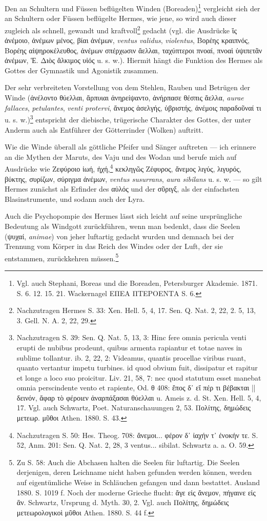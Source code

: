 \documentclass[a4paper, 11pt, oneside]{article}
\begin{document}
Den an Schultern und Füssen beflügelten Winden (Boreaden)\footnote{Vgl. auch Stephani, Boreas und die Boreaden, Petersburger Akademie. 1871. S. 6. 12. 15. 21. Wackernagel ΕΠΕΑ ΠΤΕΡΟΕΝΤΑ S. 6.} vergleicht sieh der an Schultern oder Füssen beflügelte Hermes, wie jene, so wird auch dieser zugleich als schnell, gewandt und kraftvoll\footnote{Nachzutragen Hermes S. 33: Xen. Hell. 5, 4, 17. Sen. Q. Nat. 2, 22, 2. 5, 13, 3. Gell. N. A. 2, 22, 29.} gedacht (vgl. die Ausdrücke ἲς ἀνέμοιο, ἀνέμων μένος, βίαι ἀνέμων, \emph{ventus validus}, \emph{violentus}, Βορέης κραιπνός, Βορέης αἰψηροκέλευθος, ἀνέμων σπέρχωσιν ἄελλαι, ταχύπτεροι πνοαί, πνοαὶ ὑψιπετᾶν ἀνέμων, Ἑ. Διὸς ἄλκιμος υἱός u. s. w.). Hiermit hängt die Funktion des Hermes als Gottes der Gymnastik und Agonistik zusammen.

Der sehr verbreiteten Vorstellung von dem Stehlen, Rauben und Betrügen der Winde (ἀνέλοντο θύελλαι, ἄρπυιαι ἀνηρείψαντο, ἀνήρπασε θέσπις ἄελλα, \emph{aurae fallaces}, \emph{petulantes}, \emph{venti protervi}, ἄνεμος ἀσελγής, ὑβριστής, ἀνέμοις παραδοῦναί τι u. s. w.)\footnote{Nachzutragen S. 39: Sen. Q. Nat. 5, 13, 3: Hinc fere omnia pericula venti erupti de nubibus prodeunt, quibus armenta rapiantur et totae naves in sublime tollantur. ib. 2, 22, 2: Videamus, quantis procellae viribus ruant, quanto vertantur impetu turbines. id quod obvium fuit, dissipatur et rapitur et longe a loco suo proicitur. Liv. 21, 58, 7: nec quod statutum esset manebat omnia perscindente vento et rapiente, Od. θ 408: ἔπος δ᾽ εἴ πέρ τι βέβακται || δεινόν, ἄφαρ τὸ φέροιεν ἀναρπάξασαι θύελλαι u. Ameis z. d. St. Xen. Hell. 5, 4, 17. Vgl. auch Schwartz, Poet. Naturanschauungen 2, 53. Πολίτης, δημώδεις μετεωρ. μῦθοι Athen. 1880. S. 43.} entspricht der diebische, trügerische Charakter des Gottes, der unter Anderm auch als Entführer der Götterrinder (Wolken) auftritt.

Wie die Winde überall als göttliche Pfeifer und Sänger auftreten --- ich erinnere an die Mythen der Maruts, des Vaju und des Wodan und berufe mich auf Ausdrücke wie Ζεφύροιο ἰωή, ἠχή,\footnote{Nachzutragen S. 50: Hes. Theog. 708: ἄνεμοι... φέρον δ᾽ ἰαχήν τ᾽ ἐνοκήν τε. S. 52, Anm. 201: Sen. Q. Nat. 2, 28, 3 ventus... sibilat. Schwartz a. a. O. 59.} κεκληγῶς Ζέφυρος, ἄνεμος λιγύς, λιγυρός, βύκτης, συρίζων, σύριγμα ἀνέμων, \emph{ventus susurrans}, \emph{aura sibilans} u. s. w. --- so gilt Hermes zunächst als Erfinder des αὐλός und der σῦριγξ, als der einfachsten Blasinstrumente, und sodann auch der Lyra.

Auch die Psychopompie des Hermes lässt sich leicht auf seine ursprüngliche Bedeutung als Windgott zurückführen, wenn man bedenkt, dass die Seelen (ψυχαί, \emph{animae}) von jeher luftartig gedacht wurden und demnach bei der Trennung vom Körper in das Reich des Windes oder der Luft, der sie entstammen, zurückkehren müssen.\footnote{Zu S. 58: Auch die Abchasen halten die Seelen für luftartig. Die Seelen derjenigen, deren Leichname nicht haben gefunden werden können, werden auf eigentümliche Weise in Schläuchen gefangen und dann bestattet. Ausland 1880. S. 1019 f. Noch der moderne Grieche flucht: ἄγε εἰς ἄνεμον, πήγαινε εἰς ἂν. Schwartz, Ursprung d. Myth. 30, 2. Vgl. auch Πολίτης, δημώδεις μετεωρολογικοὶ μῦθοι Athen. 1880. S. 44 f.}
\end{document}
